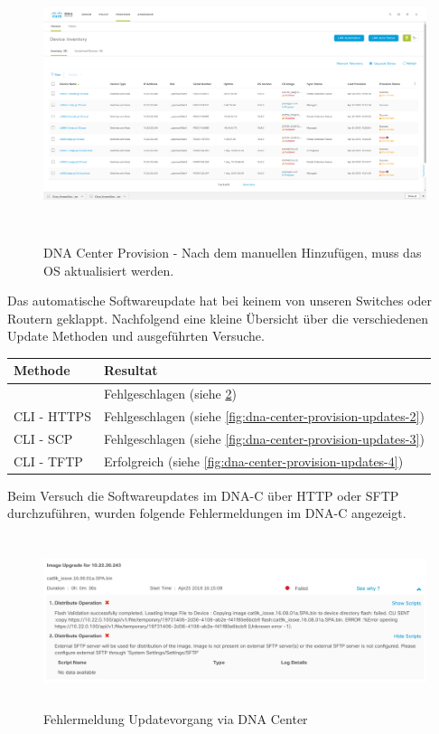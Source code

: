\begin{figure}[H]
	\centering
	\includegraphics[height=8cm]{img/updates/Selection_070.png}
	\caption{DNA Center Provision - Nach dem manuellen Hinzufügen, muss das OS aktualisiert werden.}
	\label{fig:dna-center-provision-updates}
\end{figure}

Das automatische Softwareupdate hat bei keinem von unseren Switches oder Routern geklappt. Nachfolgend eine kleine Übersicht über die verschiedenen Update Methoden und ausgeführten Versuche.

\begin{tabular}{ | l | l |}
	\hline
	\textbf{Methode} & \textbf{Resultat} \\
	\hline	
	\makecell{DNA Center über HTTP und SFTP} & Fehlgeschlagen (siehe \ref{fig:dna-center-provision-updates-1}) \\
	CLI - HTTPS    & Fehlgeschlagen (siehe \ref{fig:dna-center-provision-updates-2}) \\
	CLI - SCP      & Fehlgeschlagen (siehe \ref{fig:dna-center-provision-updates-3}) \\
	CLI - TFTP     & Erfolgreich (siehe \ref{fig:dna-center-provision-updates-4}) \\	
	\hline
\end{tabular}

Beim Versuch die Softwareupdates im DNA-C über HTTP oder SFTP durchzuführen, wurden folgende Fehlermeldungen im DNA-C angezeigt.

\begin{figure}[H]
	\centering
	\includegraphics[height=5cm]{img/updates/Selection_071.png}
	\caption{Fehlermeldung Updatevorgang via DNA Center}
	\label{fig:dna-center-provision-updates-1}
\end{figure}

